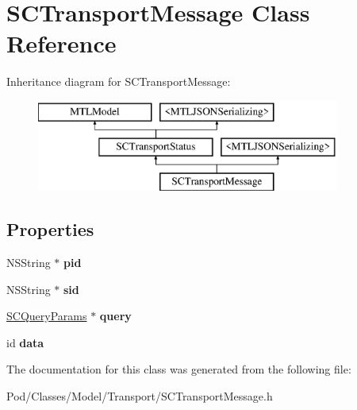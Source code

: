 \hypertarget{interface_s_c_transport_message}{}\section{S\+C\+Transport\+Message Class Reference}
\label{interface_s_c_transport_message}
Inheritance diagram for S\+C\+Transport\+Message\+:\begin{figure}[H]
\begin{center}
\leavevmode
\includegraphics[height=3.000000cm]{interface_s_c_transport_message}
\end{center}
\end{figure}
\subsection*{Properties}
\begin{DoxyCompactItemize}
\item 
N\+S\+String $\ast$ {\bfseries pid}\hypertarget{interface_s_c_transport_message_af1759fb9dd1b3f1a5f72f127ebc0fe3c}{}\label{interface_s_c_transport_message_af1759fb9dd1b3f1a5f72f127ebc0fe3c}

\item 
N\+S\+String $\ast$ {\bfseries sid}\hypertarget{interface_s_c_transport_message_a431e6b0f9ee06e522e234a8f65bc5b07}{}\label{interface_s_c_transport_message_a431e6b0f9ee06e522e234a8f65bc5b07}

\item 
\hyperlink{interface_s_c_query_params}{S\+C\+Query\+Params} $\ast$ {\bfseries query}\hypertarget{interface_s_c_transport_message_a791ee8980a2cf180ceb22867f42562db}{}\label{interface_s_c_transport_message_a791ee8980a2cf180ceb22867f42562db}

\item 
id {\bfseries data}\hypertarget{interface_s_c_transport_message_a0c4524310227f896e717a4db045aa98e}{}\label{interface_s_c_transport_message_a0c4524310227f896e717a4db045aa98e}

\end{DoxyCompactItemize}


The documentation for this class was generated from the following file\+:\begin{DoxyCompactItemize}
\item 
Pod/\+Classes/\+Model/\+Transport/S\+C\+Transport\+Message.\+h\end{DoxyCompactItemize}
